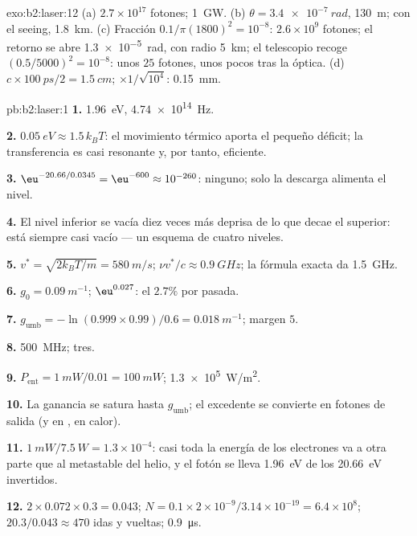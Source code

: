 \begin{solution}{exo:b2:laser:12}
(a) $2.7 \times 10^{17}$ fotones; \qty{1}{GW}. (b) $\theta = \qty{3.4e-7}{rad}$,
\qty{130}{m}; con el seeing, \qty{1.8}{km}. (c) Fracción $0.1/\pi(1800)^2 =
10^{-8}$: $2.6 \times 10^9$ fotones; el retorno se abre \qty{1.3e-5}{rad}, con radio
\qty{5}{km}; el telescopio recoge $(0.5/5000)^2 = 10^{-8}$: unos $25$
fotones, unos pocos tras la óptica. (d) $c \times \qty{100}{ps}/2 = \qty{1.5}{cm}$;
$\times 1/\sqrt{10^4}$: \qty{0.15}{mm}.
\end{solution}

\begin{solution}{pb:b2:laser:1}
\textbf{1.} \qty{1.96}{eV}, \qty{4.74e14}{Hz}.

\textbf{2.} $\qty{0.05}{eV} \approx 1.5\,k_BT$: el movimiento térmico aporta
el pequeño déficit; la transferencia es casi resonante y, por tanto, eficiente.

\textbf{3.} $\eu^{-20.66/0.0345} = \eu^{-600} \approx 10^{-260}$: ninguno; solo la
descarga alimenta el nivel.

\textbf{4.} El nivel inferior se vacía diez veces más deprisa de lo que decae el
superior: está siempre casi vacío --- un esquema de cuatro niveles.

\textbf{5.} $v^* = \sqrt{2k_BT/m} = \qty{580}{m/s}$; $\nu v^*/c \approx \qty{0.9}{GHz}$;
la fórmula exacta da \qty{1.5}{GHz}.

\textbf{6.} $g_0 = \qty{0.09}{m^{-1}}$; $\eu^{0.027}$: el $2.7\%$ por pasada.

\textbf{7.} $g_{\text{umb}} = -\ln(0.999 \times 0.99)/0.6 = \qty{0.018}{m^{-1}}$;
margen $5$.

\textbf{8.} \qty{500}{MHz}; tres.

\textbf{9.} $P_{\text{ent}} = \qty{1}{mW}/0.01 = \qty{100}{mW}$; \qty{1.3e5}{W/m^2}.

\textbf{10.} La ganancia se satura hasta $g_{\text{umb}}$; el excedente se convierte en
fotones de salida (y en , en calor).

\textbf{11.} $\qty{1}{mW}/\qty{7.5}{W} = 1.3 \times 10^{-4}$: casi toda la
energía de los electrones va a otra parte que al metastable del helio, y el
fotón se lleva \qty{1.96}{eV} de los \qty{20.66}{eV} invertidos.

\textbf{12.} $2 \times 0.072 \times 0.3 = 0.043$; $N = 0.1 \times 2 \times 10^{-9}/3.14
\times 10^{-19} = 6.4 \times 10^8$; $20.3/0.043 \approx 470$ idas y vueltas;
\qty{0.9}{\micro s}.


\end{solution}
